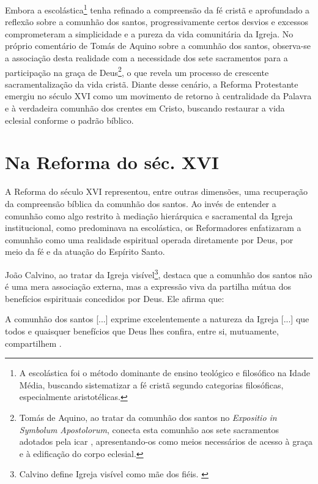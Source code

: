 Embora a escolástica\footnote{A escolástica foi o método dominante de ensino teológico e filosófico na Idade Média, buscando sistematizar a fé cristã segundo categorias filosóficas, especialmente aristotélicas.} tenha refinado a compreensão da fé cristã e aprofundado a reflexão sobre a comunhão dos santos, progressivamente certos desvios e excessos comprometeram a simplicidade e a pureza da vida comunitária da Igreja. No próprio comentário de Tomás de Aquino sobre a comunhão dos santos, observa-se a associação desta realidade com a necessidade dos sete sacramentos para a participação na graça de Deus\footnote{Tomás de Aquino, ao tratar da comunhão dos santos no \textit{\foreignlanguage{latin}{Expositio in Symbolum Apostolorum}}, conecta esta comunhão aos sete sacramentos adotados pela \gls{icar} \cite{aquinoCredo2004}, apresentando-os como meios necessários de acesso à graça e à edificação do corpo eclesial.}, o que revela um processo de crescente sacramentalização da vida cristã. Diante desse cenário, a Reforma Protestante emergiu no século XVI como um movimento de retorno à centralidade da Palavra e à verdadeira comunhão dos crentes em Cristo, buscando restaurar a vida eclesial conforme o padrão bíblico.

\section{Na Reforma do séc. XVI}

A Reforma do século XVI representou, entre outras dimensões, uma recuperação da compreensão bíblica da comunhão dos santos. Ao invés de entender a comunhão como algo restrito à mediação hierárquica e sacramental da Igreja institucional, como predominava na escolástica, os Reformadores enfatizaram a comunhão como uma realidade espiritual operada diretamente por Deus, por meio da fé e da atuação do Espírito Santo.

João Calvino, ao tratar da Igreja visível\footnote{Calvino define Igreja visível como mãe dos fiéis. \cite[v.~4, p.~1865]{calvino2022}}, destaca que a comunhão dos santos não é uma mera associação externa, mas a expressão viva da partilha mútua dos benefícios espirituais concedidos por Deus. Ele afirma que:
\begin{citacao}
A comunhão dos santos [...] exprime excelentemente a natureza da Igreja [...] que todos e quaisquer benefícios que Deus lhes confira, entre si, mutuamente, compartilhem \cite[v.~4, p.~1863]{calvino2022}.
\end{citacao}

